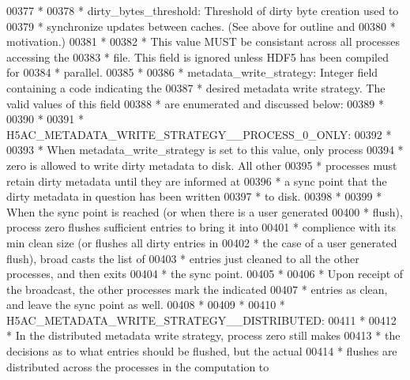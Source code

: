 \begin{DoxyCode}
00377 \textcolor{comment}{ *}
00378 \textcolor{comment}{ * dirty\_bytes\_threshold:  Threshold of dirty byte creation used to}
00379 \textcolor{comment}{ *  synchronize updates between caches. (See above for outline and}
00380 \textcolor{comment}{ *  motivation.)}
00381 \textcolor{comment}{ *}
00382 \textcolor{comment}{ *  This value MUST be consistant across all processes accessing the}
00383 \textcolor{comment}{ *  file.  This field is ignored unless HDF5 has been compiled for}
00384 \textcolor{comment}{ *  parallel.}
00385 \textcolor{comment}{ *}
00386 \textcolor{comment}{ * metadata\_write\_strategy: Integer field containing a code indicating the}
00387 \textcolor{comment}{ *  desired metadata write strategy.  The valid values of this field}
00388 \textcolor{comment}{ *  are enumerated and discussed below:}
00389 \textcolor{comment}{ *}
00390 \textcolor{comment}{ *}
00391 \textcolor{comment}{ *  H5AC\_METADATA\_WRITE\_STRATEGY\_\_PROCESS\_0\_ONLY:}
00392 \textcolor{comment}{ *}
00393 \textcolor{comment}{ *  When metadata\_write\_strategy is set to this value, only process }
00394 \textcolor{comment}{ *  zero is allowed to write dirty metadata to disk.  All other }
00395 \textcolor{comment}{ *  processes must retain dirty metadata until they are informed at}
00396 \textcolor{comment}{ *  a sync point that the dirty metadata in question has been written}
00397 \textcolor{comment}{ *  to disk.}
00398 \textcolor{comment}{ *}
00399 \textcolor{comment}{ *  When the sync point is reached (or when there is a user generated}
00400 \textcolor{comment}{ *  flush), process zero flushes sufficient entries to bring it into}
00401 \textcolor{comment}{ *  complience with its min clean size (or flushes all dirty entries in}
00402 \textcolor{comment}{ *  the case of a user generated flush), broad casts the list of }
00403 \textcolor{comment}{ *  entries just cleaned to all the other processes, and then exits}
00404 \textcolor{comment}{ *  the sync point.}
00405 \textcolor{comment}{ *}
00406 \textcolor{comment}{ *  Upon receipt of the broadcast, the other processes mark the indicated}
00407 \textcolor{comment}{ *  entries as clean, and leave the sync point as well.}
00408 \textcolor{comment}{ *}
00409 \textcolor{comment}{ *}
00410 \textcolor{comment}{ *  H5AC\_METADATA\_WRITE\_STRATEGY\_\_DISTRIBUTED:}
00411 \textcolor{comment}{ *}
00412 \textcolor{comment}{ *  In the distributed metadata write strategy, process zero still makes}
00413 \textcolor{comment}{ *  the decisions as to what entries should be flushed, but the actual }
00414 \textcolor{comment}{ *  flushes are distributed across the processes in the computation to }

\end{DoxyCode}
